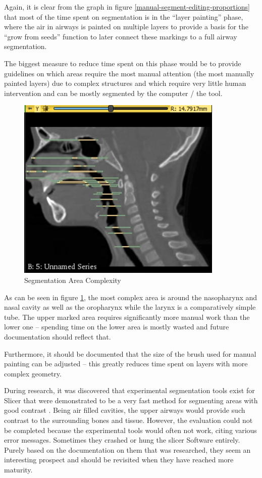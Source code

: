 \documentclass[MME,Projekt,english]{twbook}%
\begin{document}
Again, it is clear from the graph in figure \ref{manual-segment-editing-proportions} that most of the time spent on segmentation is in the “layer painting” phase, where the air in airways is painted on multiple layers to provide a basis for the “grow from seeds” function to later connect these markings to a full airway segmentation.

The biggest measure to reduce time spent on this phase would be to provide guidelines on which areas require the most manual attention (the most manually painted layers) due to complex structures and which require very little human intervention and can be mostly segmented by the computer / the tool.

\begin{figure}[!htbp]
	\centering
	\includegraphics[width=.4\linewidth]{images/segmentation-area-complexity}
	\caption{Segmentation Area Complexity}\label{segmentation-area-complexity}
\end{figure}

As can be seen in figure \ref{segmentation-area-complexity}, the most complex area is around the nasopharynx and nasal cavity as well as the oropharynx while the larynx is a comparatively simple tube. The upper marked area requires significantly more manual work than the lower one – spending time on the lower area is mostly wasted and future documentation should reflect that.

Furthermore, it should be documented that the size of the brush used for manual painting can be adjusted – this greatly reduces time spent on layers with more complex geometry.

During research, it was discovered that experimental segmentation tools exist for Slicer that were demonstrated to be a very fast method for segmenting areas with good contrast \cite{fast-marching}. Being air filled cavities, the upper airways would provide such contrast to the surrounding bones and tissue. However, the evaluation could not be completed because the experimental tools would often not work, citing various error messages. Sometimes they crashed or hung the slicer Software entirely. Purely based on the documentation on them that was researched, they seem an interesting prospect and should be revisited when they have reached more maturity.
\end{document}
